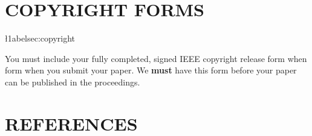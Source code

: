 \documentclass{article}
\begin{document}


\vfill
\pagebreak

\section{COPYRIGHT FORMS}
\l1abel{sec:copyright}

You must include your fully completed, signed IEEE copyright release form when
form when you submit your paper. We {\bf must} have this form before your paper
can be published in the proceedings.

\section{REFERENCES}
\label{sec:ref}
  



%
% 
\end{document}

